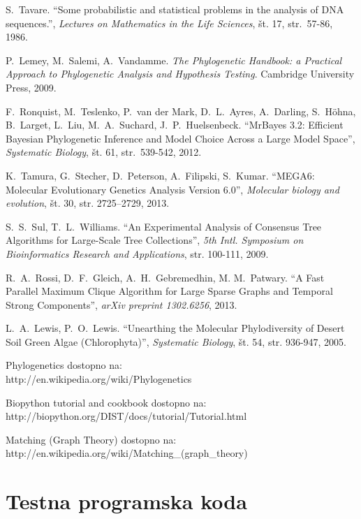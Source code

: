 \documentclass[a4paper, 12pt]{book}
\begin{document}
\begin{thebibliography}{99}
S.\ Tavare. ``Some probabilistic and statistical problems in the analysis of DNA sequences.'', {\it Lectures on Mathematics in the Life Sciences}, št. 17, str.\ 57-86,  1986.

P.\ Lemey, M.\ Salemi, A.\ Vandamme. \textit{The Phylogenetic Handbook: a Practical Approach to Phylogenetic Analysis and Hypothesis Testing}. Cambridge University Press, 2009.

F.\ Ronquist, M.\ Teslenko, P.\ van der Mark, D.\ L.\ Ayres, A.\ Darling, S.\ Höhna, B.\ Larget, L.\ Liu, M.\ A.\ Suchard, J.\ P.\ Huelsenbeck. 
``MrBayes 3.2: Efficient Bayesian Phylogenetic Inference and Model Choice Across a Large Model Space'', {\it Systematic Biology}, št. 61, str.\ 539-542, 2012.

K.\ Tamura, G.\ Stecher, D.\ Peterson, A.\ Filipski, S.\ Kumar. ``MEGA6: Molecular Evolutionary Genetics Analysis Version 6.0'', 
{\it Molecular biology and evolution}, št. 30, str. 2725–2729, 2013.

S.\ S.\ Sul, T.\ L.\ Williams. ``An Experimental Analysis of Consensus Tree Algorithms for Large-Scale Tree Collections'', 
{\it 5th Intl. Symposium on Bioinformatics Research and Applications}, str. 100-111, 2009.

R.\ A.\ Rossi, D.\ F.\ Gleich, A.\ H.\ Gebremedhin, M. M.\ Patwary.  
``A Fast Parallel Maximum Clique Algorithm for Large Sparse Graphs and Temporal Strong Components'', {\it arXiv preprint 1302.6256}, 2013.  

L.\ A.\ Lewis, P.\ O.\ Lewis. ``Unearthing the Molecular Phylodiversity of Desert Soil Green Algae (Chlorophyta)'', 
{\it Systematic Biology}, št. 54, str. 936-947, 2005.

Phylogenetics
dostopno na:\\ http://en.wikipedia.org/wiki/Phylogenetics

Biopython tutorial and cookbook
dostopno na: \\ http://biopython.org/DIST/docs/tutorial/Tutorial.html

Matching (Graph Theory)
dostopno na: \\ http://en.wikipedia.org/wiki/Matching\_(graph\_theory)


\end{thebibliography}

\newpage
\appendix
\chapter{Testna programska koda \label{appendix-code-metrics}}
\end{document}
